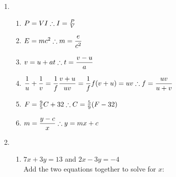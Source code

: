 \begin{eocsolutions}{}
{\begin{enumerate}[itemsep=7pt, label=\textbf{\arabic*}. ]
\begin{multicols}{2}
\begin{enumerate}[itemsep=6pt,label=\textbf{(\alph*)}]
\item $\dfrac{1-a}{2} - \dfrac{2-a}{3} \geq 1\\
\dfrac{1-a}{2} - \dfrac{(2+a)}{3} \geq 1\\
3-3a-4-2a \geq 6\\
-5a \geq 7\\
\therefore~ a \leq -\frac{7}{5}$
\item $-5 \leq 2k + 1 < 5\\
-6 \leq 2k < 4\\
\therefore -3 \leq k < 2$
\item $x-1=\dfrac{42}{x}\\$
Note that $x \neq 0$.\\
$x^2-x=42\\
x^2-x-42=0\\
(x-7)(x+6)=0\\
\therefore x=7$ or $x=-6$
\end{enumerate}
\end{multicols}
\item
\begin{enumerate}[itemsep=6pt,label=\textbf{(\alph*)}]
\item $P = VI\\
\therefore I =\frac{P}{V}$
\item $E=mc^{2}\\[4pt]
\therefore m=\dfrac{e}{c^2}$
\item $v = u + at\\[4pt]
\therefore t = \dfrac{v-u}{a}$
\item $\dfrac{1}{u} + \dfrac{1}{v} = \dfrac{1}{f}\\
\dfrac{v+u}{uv} = \dfrac{1}{f}\\
f(v+u) = uv\\[4pt]
\therefore f= \dfrac{uv}{u+v}$
\item  $F=\frac{9}{5}C + 32\\
\therefore C=\frac{5}{9}(F-32)$
\item $m = \dfrac{y-c}{x}\\[4pt]
\therefore y = mx+c$
\end{enumerate}
\item 
\begin{enumerate}[itemsep=5pt,label=\textbf{(\alph*)}]
\item $7x+3y=13$ and $2x-3y=-4$\\
Add the two equations together to solve for $x$:\\


\end{enumerate}
\end{enumerate}}
\end{eocsolutions}
